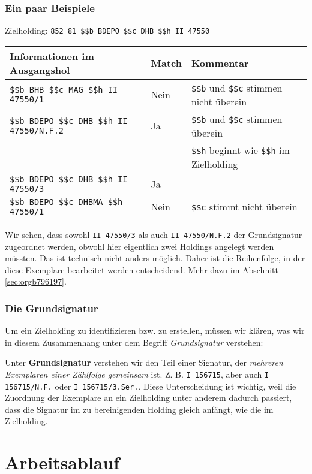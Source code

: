 \documentclass[10pt, a4paper]{scrartcl}
\begin{document}
\subsubsection{Ein paar Beispiele}
\label{sec:org07f7c43}
Zielholding: \texttt{852 81 \$\$b BDEPO \$\$c DHB \$\$h II 47550}

\begin{center}
\begin{tabular}{lll}
Informationen im Ausgangshol & Match & Kommentar\\
\hline
\texttt{\$\$b BHB \$\$c MAG \$\$h II 47550/1} & Nein & \texttt{\$\$b} und \texttt{\$\$c} stimmen nicht überein\\
\texttt{\$\$b BDEPO \$\$c DHB \$\$h II 47550/N.F.2} & Ja & \texttt{\$\$b} und \texttt{\$\$c} stimmen überein\\
 &  & \texttt{\$\$h} beginnt wie \texttt{\$\$h} im Zielholding\\
\texttt{\$\$b BDEPO \$\$c DHB \$\$h II 47550/3} & Ja & \\
\texttt{\$\$b BDEPO \$\$c DHBMA \$\$h 47550/1} & Nein & \texttt{\$\$c} stimmt nicht überein\\
\end{tabular}
\end{center}

Wir sehen, dass sowohl \texttt{II 47550/3} als auch \texttt{II 47550/N.F.2} der
Grundsignatur zugeordnet werden, obwohl hier eigentlich zwei Holdings
angelegt werden müssten. Das ist technisch nicht anders möglich. Daher
ist die Reihenfolge, in der diese Exemplare bearbeitet werden
entscheidend. Mehr dazu im Abschnitt \ref{sec:orgb796197}.



\subsubsection{Die Grundsignatur}
\label{sec:orgae5af92}
Um ein Zielholding zu identifizieren bzw. zu erstellen, müssen wir klären,
was wir in diesem Zusammenhang unter dem Begriff \emph{Grundsignatur} verstehen:

Unter \textbf{Grundsignatur} verstehen wir den Teil einer Signatur, der \emph{mehreren
Exemplaren einer Zählfolge gemeinsam} ist. Z. B. \texttt{I 156715}, aber auch \texttt{I
        156715/N.F.} oder \texttt{I 156715/3.Ser.}. Diese Unterscheidung ist wichtig, weil
die Zuordnung der Exemplare an ein Zielholding unter anderem dadurch
passiert, dass die Signatur im zu bereinigenden Holding gleich anfängt, wie
die im Zielholding.
\section{Arbeitsablauf}
\label{sec:org7fd2420}
\end{document}
